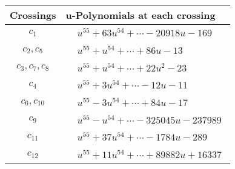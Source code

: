 \documentclass[1p]{elsarticle_modified}
\theoremstyle{definition}
\begin{document}
\begin{tabular}{m{50pt}|m{274pt}}
Crossings & \hspace{64pt}u-Polynomials at each crossing \\
\hline $$\begin{aligned}c_{1}\end{aligned}$$&$\begin{aligned}
&u^{55}+63 u^{54}+\cdots-20918 u-169
\end{aligned}$\\
\hline $$\begin{aligned}c_{2},c_{5}\end{aligned}$$&$\begin{aligned}
&u^{55}+u^{54}+\cdots+86 u-13
\end{aligned}$\\
\hline $$\begin{aligned}c_{3},c_{7},c_{8}\end{aligned}$$&$\begin{aligned}
&u^{55}+u^{54}+\cdots+22 u^2-23
\end{aligned}$\\
\hline $$\begin{aligned}c_{4}\end{aligned}$$&$\begin{aligned}
&u^{55}+3 u^{54}+\cdots-12 u-11
\end{aligned}$\\
\hline $$\begin{aligned}c_{6},c_{10}\end{aligned}$$&$\begin{aligned}
&u^{55}-3 u^{54}+\cdots+84 u-17
\end{aligned}$\\
\hline $$\begin{aligned}c_{9}\end{aligned}$$&$\begin{aligned}
&u^{55}- u^{54}+\cdots-325045 u-237989
\end{aligned}$\\
\hline $$\begin{aligned}c_{11}\end{aligned}$$&$\begin{aligned}
&u^{55}+37 u^{54}+\cdots-1784 u-289
\end{aligned}$\\
\hline $$\begin{aligned}c_{12}\end{aligned}$$&$\begin{aligned}
&u^{55}+11 u^{54}+\cdots+89882 u+16337
\end{aligned}$\\
\hline
\end{tabular}\\~\\
\end{document}
